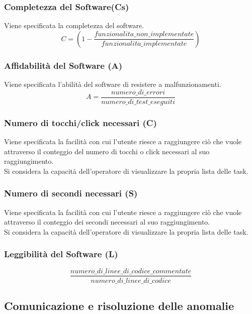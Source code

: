 \subsubsection{Completezza del Software(Cs)}
Viene specificata la completezza del software.
\[C = (1- \frac{funzionalita\_non\_implementate }{funzionalita\_implementate})\]

\subsubsection{Affidabilità del Software (A)}
Viene specificata l'abilità del software di resistere a malfunzionamenti.
\[A = \frac{numero\_di\_errori}{numero\_di\_test\_eseguiti}\]

\subsubsection{Numero di tocchi/click necessari (C)}
Viene specificata la facilità con cui l'utente riesce a raggiungere ciò che vuole attraverso il conteggio del numero di tocchi o click necessari al suo raggiungimento.\\
Si considera la capacità dell'operatore di visualizzare la propria lista delle task.

\subsubsection{Numero di secondi necessari (S)}
Viene specificata la facilità con cui l'utente riesce a raggiungere ciò che vuole attraverso il conteggio dei secondi necessari al suo raggiungimento.\\
Si considera la capacità dell'operatore di visualizzare la propria lista delle task.

\subsubsection{Leggibilità del Software (L)}
\[\frac{numero\_di\_linee\_di\_codice\_commentate}{numero\_di\_linee\_di\_codice}\]

\subsection{Comunicazione e risoluzione delle anomalie}
